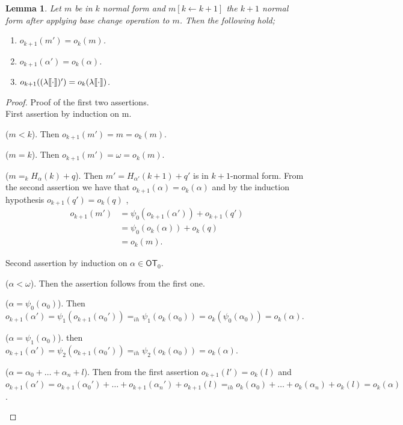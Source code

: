 \documentclass{amsart}
\theoremstyle{plain}
\theoremstyle{plain}
\newtheorem{lemma}[theorem]{Lemma}
\def\scbrl{[\hspace{-.14em}[}
\def\scbrr{]\hspace{-.14em}]}
\def\scbr#1{\scbrl#1\scbrr}
\newcommand\OT{\mathsf{OT}}
\newcommand{\kp}{[k\leftarrow k+1]}
\newcommand{\okpe}{o_{k+1}}
\newcommand{\ok}{o_{k}}
\newcommand{\al}{{\alpha}}
\newcommand{\la}{\lambda}
\newcommand{\om}{\omega}
\def\scbrl{[\hspace{-.14em}[}
\def\scbrr{]\hspace{-.14em}]}
\def\scbr#1{\scbrl#1\scbrr}
\begin{document}
\smallskip

\begin{lemma} \label{lm:okpe=ok} Let $m$ be in $k$ normal form and $m\kp$ the $k+1$ normal form after applying base change operation to $m$. Then the following hold;
\begin{enumerate}
    \item $\okpe(m') = \ok(m)$.
    \item $\okpe(\al') =\ok(\al)$.
    \item $\okpe((\la\scbr{\cdot})')=\ok(\la\scbr{\cdot})$.
\end{enumerate}
\end{lemma}
\begin{proof}
Proof of the first two assertions.\\
First assertion by induction on m.
\begin{Cases}
    \item ($m<k$). Then $\okpe(m') = m = \ok(m)$.
    \item ($m=k$). Then $\okpe(m') = \om = \ok(m)$.
    \item ($m=_{k} H_\al(k) + q$). Then $m' = H_{\al'}(k+1)+ q'$ is in $k+1$-normal form. From the second assertion we have that $\okpe(\al)=\ok(\al)$ and by the induction hypothesis $\okpe(q')=\ok(q)$	, 
    \begin{align*}
        \okpe(m')  &= \psi_0(\okpe(\al')) + \okpe(q')\\
        & = \psi_0(\ok(\al))  + \ok(q)\\
        &= \ok(m).
    \end{align*} 
\end{Cases}
Second assertion by induction on $\al \in \OT_0$.
\begin{Cases}
    \item ($\al<\om$). Then the assertion follows from the first one.
    \item ($\al= \psi_0(\al_0)$).
    Then $\okpe(\al') = \psi_1(\okpe(\al_0')) =_{ih} \psi_1(\ok(\al_0)) = \ok(\psi_0(\al_0)) = \ok(\al)$.
    \item ($\al=\psi_1(\al_0)$).
    then  $\okpe(\al') = \psi_2(\okpe(\al_0')) =_{ih} \psi_2(\ok(\al_0)) = \ok(\al)$.
    \item ($\al = \al_0 + \ldots + \al_n +l $). Then from the first assertion $\okpe(l')=\ok(l)$ and
    $\okpe(\al') = \okpe(\al_0') + \ldots + \okpe(\al_n') + \okpe(l) =_{ih} \ok(\al_0) + \ldots + \ok(\al_n) + \ok(l) = \ok(\al)$.
\end{Cases}
\end{proof}
\end{document}
